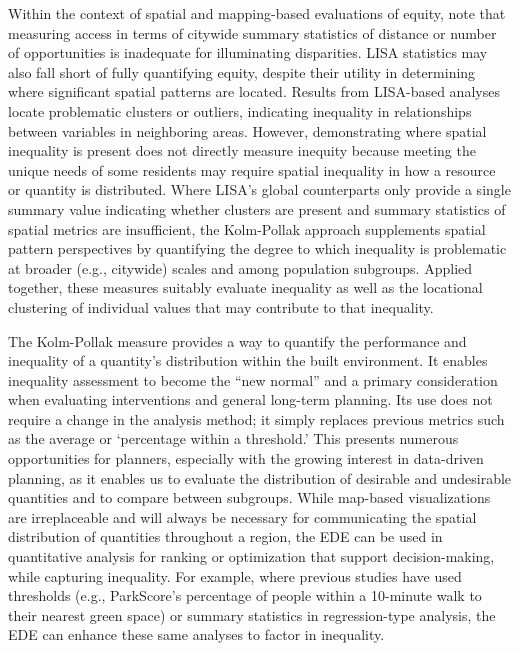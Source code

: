 \documentclass[final,3p,times,onecolumn,sort&compress]{elsarticle}
\begin{document}
Within the context of spatial and mapping-based evaluations of equity, \cite{Kolak2018-az} note that measuring access in terms of citywide summary statistics of distance or number of opportunities is inadequate for illuminating disparities. 
LISA statistics may also fall short of fully quantifying equity, despite their utility in determining where significant spatial patterns are located. 
Results from LISA-based analyses locate problematic clusters or outliers, indicating inequality in relationships between variables in neighboring areas. 
However, demonstrating where spatial inequality is present does not directly measure inequity because meeting the unique needs of some residents may require spatial inequality in how a resource or quantity is distributed.
Where LISA’s global counterparts only provide a single summary value indicating whether clusters are present and summary statistics of spatial metrics are insufficient, the Kolm-Pollak approach supplements spatial pattern perspectives by quantifying the degree to which inequality is problematic at broader (e.g., citywide) scales and among population subgroups. 
Applied together, these measures suitably evaluate inequality as well as the locational clustering of individual values that may contribute to that inequality.

The Kolm-Pollak measure provides a way to quantify the performance and inequality of a quantity's distribution within the built environment.
It enables inequality assessment to become the ``new normal'' and a primary consideration when evaluating interventions and general long-term planning. 
Its use does not require a change in the analysis method; it simply replaces previous metrics such as the average or `percentage within a threshold.'
This presents numerous opportunities for planners, especially with the growing interest in data-driven planning, as it enables us to evaluate the distribution of desirable and undesirable quantities and to compare between subgroups.
While map-based visualizations are irreplaceable and will always be necessary for communicating the spatial distribution of quantities throughout a region, the EDE can be used in quantitative analysis for ranking or optimization that support decision-making, while capturing inequality.
For example, where previous studies have used thresholds (e.g., ParkScore's percentage of people within a 10-minute walk to their nearest green space) or summary statistics in regression-type analysis, the EDE can enhance these same analyses to factor in inequality.
\end{document}
